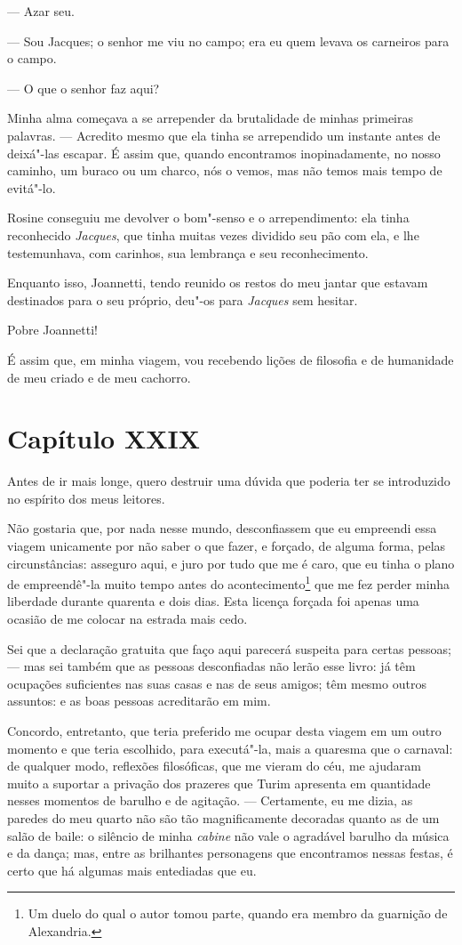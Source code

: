  --- Azar seu.

 --- Sou Jacques; o senhor me viu no campo; era eu quem levava os
carneiros para o campo.

 --- O que o senhor faz aqui?

 Minha alma começava a se arrepender da brutalidade de minhas primeiras
palavras. --- Acredito mesmo que ela tinha se arrependido um instante
antes de deixá"-las escapar. É assim que, quando encontramos
inopinadamente, no nosso caminho, um buraco ou um charco, nós o vemos,
mas não temos mais tempo de evitá"-lo.

 Rosine conseguiu me devolver o bom"-senso e o arrependimento: ela tinha
reconhecido \textit{Jacques}, que tinha muitas vezes dividido seu pão
com ela, e lhe testemunhava, com carinhos, sua lembrança e seu
reconhecimento.

 Enquanto isso, Joannetti, tendo reunido os restos do meu jantar que
estavam destinados para o seu próprio, deu"-os para \textit{Jacques} sem
hesitar.

 Pobre Joannetti!

 É assim que, em minha viagem, vou recebendo lições de filosofia e de
humanidade de meu criado e de meu cachorro.

\section*{Capítulo XXIX}

 Antes de ir mais longe, quero destruir uma dúvida que poderia ter se
introduzido no espírito dos meus leitores. 

 Não gostaria que, por nada nesse mundo, desconfiassem que eu empreendi
essa viagem unicamente por não saber o que fazer, e forçado, de alguma
forma, pelas circunstâncias: asseguro aqui, e juro por tudo que me é
caro, que eu tinha o plano de empreendê"-la muito tempo antes do
acontecimento\footnote{ Um duelo do qual o autor tomou parte, quando
era membro da guarnição de Alexandria.}  que me fez perder minha
liberdade durante quarenta e dois dias. Esta licença forçada foi apenas
uma ocasião de me colocar na estrada mais cedo.

 Sei que a declaração gratuita que faço aqui parecerá suspeita para
certas pessoas; --- mas sei também que as pessoas desconfiadas não
lerão esse livro: já têm ocupações suficientes nas suas casas e nas de
seus amigos; têm mesmo outros assuntos: e as boas pessoas acreditarão
em mim.

 Concordo, entretanto, que teria preferido me ocupar desta viagem em um
outro momento e que teria escolhido, para executá"-la, mais a quaresma
que o carnaval: de qualquer modo, reflexões filosóficas, que me vieram
do céu, me ajudaram muito a suportar a privação dos prazeres que Turim
apresenta em quantidade nesses momentos de barulho e de agitação. ---
Certamente, eu me dizia, as paredes do meu quarto não são tão
magnificamente decoradas quanto as de um salão de baile: o silêncio de
minha \textit{cabine} não vale o agradável barulho da música e da
dança; mas, entre as brilhantes personagens que encontramos nessas
festas, é certo que há algumas mais entediadas que eu. 

